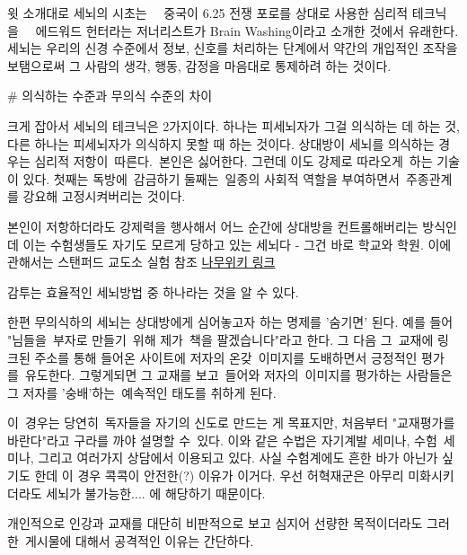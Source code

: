 윗 소개대로 세뇌의 시초는   중국이 6.25 전쟁 포로를 상대로 사용한 심리적 테크닉을   에드워드 헌터라는 저너리스트가 Brain Washing이라고 소개한 것에서 유래한다.
세뇌는 우리의 신경 수준에서 정보, 신호를 처리하는 단계에서
약간의 개입적인 조작을 보탬으로써
그 사람의 생각, 행동, 감정을 마음대로 통제하려 하는 것이다.
\vspace{5mm}

$\#$ 의식하는 수준과 무의식 수준의 차이
\vspace{5mm}

크게 잡아서 세뇌의 테크닉은 2가지이다.
하나는 피세뇌자가 그걸 의식하는 데 하는 것, 다른 하나는 피세뇌자가 의식하지 못할 때 하는 것이다.
상대방이 세뇌를 의식하는 경우는 심리적 저항이 따른다. 본인은 싫어한다.
그런데 이도 강제로 따라오게 하는 기술이 있다.
첫째는 독방에 감금하기
둘째는 일종의 사회적 역할을 부여하면서 주종관계를 강요해 고정시켜버리는 것이다.
\vspace{5mm}

본인이 저항하더라도 강제력을 행사해서 어느 순간에 상대방을 컨트롤해버리는 방식인데
이는 수험생들도 자기도 모르게 당하고 있는 세뇌다 - 그건 바로 학교와 학원.
이에 관해서는 스탠퍼드 교도소 실험 참조
\href{https://namu.wiki/w/%EC%8A%A4%ED%83%A0%ED%8D%BC%EB%93%9C%20%EA%B5%90%EB%8F%84%EC%86%8C%20%EC%8B%A4%ED%97%98}{나무위키 링크}
\vspace{5mm}

감투는 효율적인 세뇌방법 중 하나라는 것을 알 수 있다.
\vspace{5mm}

한편 무의식하의 세뇌는 상대방에게 심어놓고자 하는 명제를 '숨기면' 된다.
예를 들어 "님들을 부자로 만들기 위해 제가 책을 팔겠습니다"라고 한다.
그 다음 그 교재에 링크된 주소를 통해 들어온 사이트에 저자의 온갖 이미지를 도배하면서 긍정적인 평가를 유도한다.
그렇게되면 그 교재를 보고 들어와 저자의 이미지를 평가하는 사람들은 그 저자를 '숭배'하는 예속적인 태도를 취하게 된다.
\vspace{5mm}

이 경우는 당연히 독자들을 자기의 신도로 만드는 게 목표지만, 처음부터 "교재평가를 바란다"라고 구라를 까야 설명할 수 있다.
이와 같은 수법은 자기계발 세미나, 수험 세미나, 그리고 여러가지 상담에서 이용되고 있다.
사실 수험계에도 흔한 바가 아닌가 싶기도 한데
이 경우 콕콕이 안전한(?) 이유가 이거다. 우선 허혁재군은 아무리 미화시키더라도 세뇌가 불가능한.... 에 해당하기 때문이다.
\vspace{5mm}

개인적으로 인강과 교재를 대단히 비판적으로 보고
심지어 선량한 목적이더라도 그러한 게시물에 대해서 공격적인 이유는 간단하다.
\vspace{5mm}


